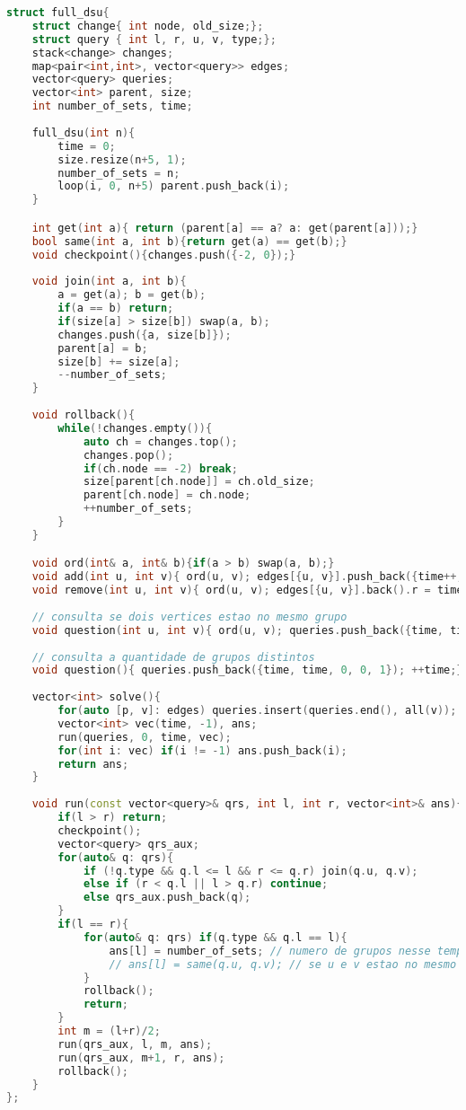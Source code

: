 \documentclass[11pt, a4paper, twoside]{article}
\begin{document}
\begin{lstlisting}[language=C++]
struct full_dsu{
    struct change{ int node, old_size;};
    struct query { int l, r, u, v, type;};
    stack<change> changes;
    map<pair<int,int>, vector<query>> edges;
    vector<query> queries;
    vector<int> parent, size;
    int number_of_sets, time;
    
    full_dsu(int n){
        time = 0;
        size.resize(n+5, 1);
        number_of_sets = n;
        loop(i, 0, n+5) parent.push_back(i);
    }

    int get(int a){ return (parent[a] == a? a: get(parent[a]));}
    bool same(int a, int b){return get(a) == get(b);}
    void checkpoint(){changes.push({-2, 0});}
    
    void join(int a, int b){
        a = get(a); b = get(b);
        if(a == b) return;   
        if(size[a] > size[b]) swap(a, b);
        changes.push({a, size[b]});
        parent[a] = b;
        size[b] += size[a];
        --number_of_sets;
    }
    
    void rollback(){
        while(!changes.empty()){
            auto ch = changes.top();
            changes.pop();
            if(ch.node == -2) break;
            size[parent[ch.node]] = ch.old_size;
            parent[ch.node] = ch.node;  
            ++number_of_sets;
        }
    }

    void ord(int& a, int& b){if(a > b) swap(a, b);}
    void add(int u, int v){ ord(u, v); edges[{u, v}].push_back({time++, (int)1e9, u, v, 0});}
    void remove(int u, int v){ ord(u, v); edges[{u, v}].back().r = time++;}
    
    // consulta se dois vertices estao no mesmo grupo
    void question(int u, int v){ ord(u, v); queries.push_back({time, time, u, v, 1}); ++time;}
    
    // consulta a quantidade de grupos distintos
    void question(){ queries.push_back({time, time, 0, 0, 1}); ++time;}
    
    vector<int> solve(){
        for(auto [p, v]: edges) queries.insert(queries.end(), all(v));
        vector<int> vec(time, -1), ans;
        run(queries, 0, time, vec);
        for(int i: vec) if(i != -1) ans.push_back(i);
        return ans;
    }
    
    void run(const vector<query>& qrs, int l, int r, vector<int>& ans){
        if(l > r) return;
        checkpoint();
        vector<query> qrs_aux;
        for(auto& q: qrs){
            if (!q.type && q.l <= l && r <= q.r) join(q.u, q.v); 
            else if (r < q.l || l > q.r) continue;
            else qrs_aux.push_back(q);
        }
        if(l == r){
            for(auto& q: qrs) if(q.type && q.l == l){
                ans[l] = number_of_sets; // numero de grupos nesse tempo
                // ans[l] = same(q.u, q.v); // se u e v estao no mesmo grupo
            }
            rollback();
            return;
        }
        int m = (l+r)/2;
        run(qrs_aux, l, m, ans);
        run(qrs_aux, m+1, r, ans);
        rollback();
    }
};
\end{lstlisting}
\end{document}
